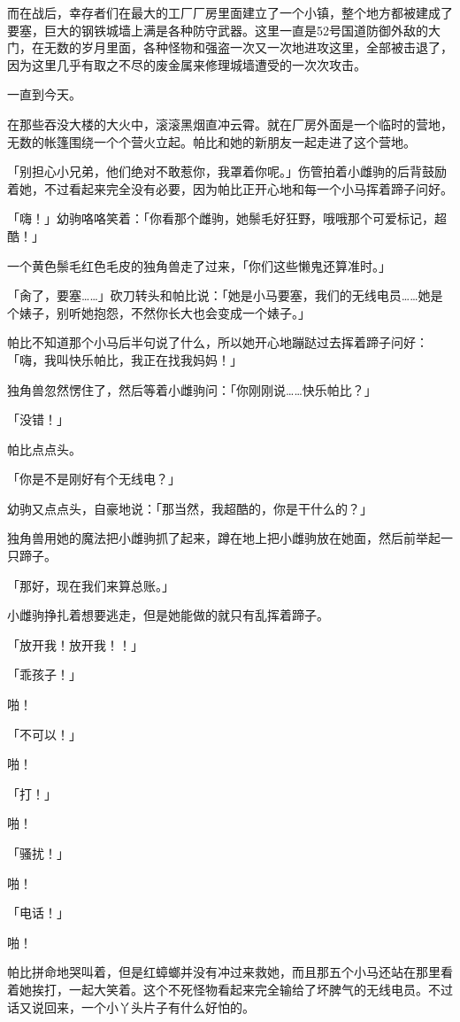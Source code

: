 而在战后，幸存者们在最大的工厂厂房里面建立了一个小镇，整个地方都被建成了要塞，巨大的钢铁城墙上满是各种防守武器。这里一直是52号国道防御外敌的大门，在无数的岁月里面，各种怪物和强盗一次又一次地进攻这里，全部被击退了，因为这里几乎有取之不尽的废金属来修理城墙遭受的一次次攻击。

一直到今天。

在那些吞没大楼的大火中，滚滚黑烟直冲云霄。就在厂房外面是一个临时的营地，无数的帐篷围绕一个个营火立起。帕比和她的新朋友一起走进了这个营地。

「别担心小兄弟，他们绝对不敢惹你，我罩着你呢。」伤管拍着小雌驹的后背鼓励着她，不过看起来完全没有必要，因为帕比正开心地和每一个小马挥着蹄子问好。

「嗨！」幼驹咯咯笑着：「你看那个雌驹，她鬃毛好狂野，哦哦那个可爱标记，超酷！」

一个黄色鬃毛红色毛皮的独角兽走了过来，「你们这些懒鬼还算准时。」

「肏了，要塞……」砍刀转头和帕比说：「她是小马要塞，我们的无线电员……她是个婊子，别听她抱怨，不然你长大也会变成一个婊子。」

帕比不知道那个小马后半句说了什么，所以她开心地蹦跶过去挥着蹄子问好：「嗨，我叫快乐帕比，我正在找我妈妈！」

独角兽忽然愣住了，然后等着小雌驹问：「你刚刚说……快乐帕比？」

「没错！」

帕比点点头。

「你是不是刚好有个无线电？」

幼驹又点点头，自豪地说：「那当然，我超酷的，你是干什么的？」

独角兽用她的魔法把小雌驹抓了起来，蹲在地上把小雌驹放在她面，然后前举起一只蹄子。

「那好，现在我们来算总账。」

小雌驹挣扎着想要逃走，但是她能做的就只有乱挥着蹄子。

「放开我！放开我！！」

「乖孩子！」

啪！

「不可以！」

啪！

「打！」

啪！

「骚扰！」

啪！

「电话！」

啪！

帕比拼命地哭叫着，但是红蟑螂并没有冲过来救她，而且那五个小马还站在那里看着她挨打，一起大笑着。这个不死怪物看起来完全输给了坏脾气的无线电员。不过话又说回来，一个小丫头片子有什么好怕的。


